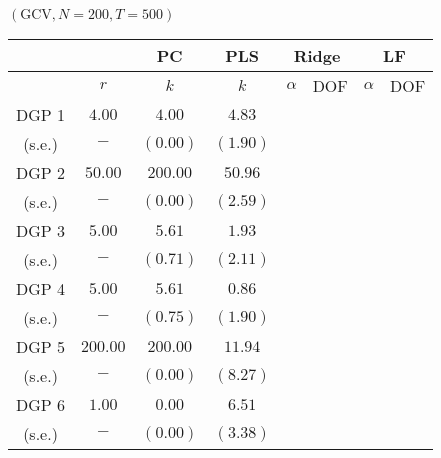 \begin{center} $(\mathrm{GCV}, N=200, T=500)$ \\
	\begin{tabular}{cccccccc}
		\hline \hline 
		& & PC & PLS & \multicolumn{2}{c}{Ridge} & \multicolumn{2}{c}{LF} \\
		\hline 
		& $r$ & $k$ & $k$ & $\alpha$ & DOF & $\alpha$ & DOF \\
		\hline 
		DGP 1 & $4.00$ & $4.00$ & $4.83$ & & & & \\
		(s.e.) & $-$ & $(0.00)$ & $(1.90)$ & & & & \\
		DGP 2 & $50.00$ & $200.00$ & $50.96$ & & & & \\
		(s.e.) & $-$ & $(0.00)$ & $(2.59)$ & & & & \\
		DGP 3 & $5.00$ & $5.61$ & $1.93$ & & & & \\
		(s.e.) & $-$ & $(0.71)$ & $(2.11)$ & & & & \\
		DGP 4 & $5.00$ & $5.61$ & $0.86$ & & & & \\
		(s.e.) & $-$ & $(0.75)$ & $(1.90)$ & & & & \\
		DGP 5 & $200.00$ & $200.00$ & $11.94$ & & & & \\
		(s.e.) & $-$ & $(0.00)$ & $(8.27)$ & & & & \\
		DGP 6 & $1.00$ & $0.00$ & $6.51$ & & & & \\
		(s.e.) & $-$ & $(0.00)$ & $(3.38)$ & & & & \\
		\hline
	\end{tabular}
\end{center}